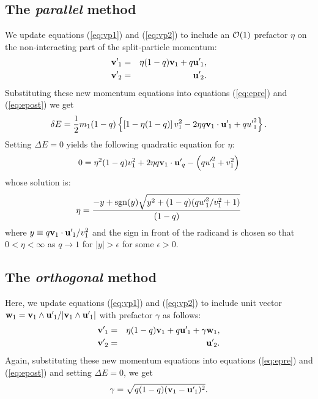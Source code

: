 \documentclass[12pt]{article}
\newcommand*{\myprime}{^{\prime}\mkern-1.2mu}
\newcommand{\bv}{{\bf v}}
\newcommand{\bw}{{\bf w}}
\newcommand{\bvp}{{\bf v}\myprime}
\newcommand{\bup}{{\bf u}\myprime}
\newcommand{\sgn}{\mathop{\rm sgn}\nolimits}
\begin{document}
\subsection{The \emph{parallel} method}

We update equations (\ref{eq:vp1}) and (\ref{eq:vp2}) to include an
${\cal O}(1)$ prefactor $\eta$ on the non-interacting part of the
split-particle momentum:
\begin{eqnarray}
\bvp_1 &=& \eta(1-q)\bv_1 + q\bup_1, \label{eq:vp1para}\\
\bvp_2 &=& \bup_2. \label{eq:vp2para}
\end{eqnarray}
Substituting these new momentum equations into equations
(\ref{eq:epre}) and (\ref{eq:epost}) we get
\begin{equation}
  \delta E = \frac12m_1(1-q)\left\{
  \left[1 - \eta(1-q)\right]v_1^2 - 2\eta q \bv_1\cdot\bup_1 +
  q{u\myprime}_1^2
  \right\}.
\end{equation}
Setting $\Delta E=0$ yields the following quadratic equation for
$\eta$:
\begin{equation}
  0 = \eta^2(1-q)v_1^2 + 2\eta q \bv_1\cdot\bup_q
  -\left(q{u\myprime}_1^2 + v_1^2\right)
\end{equation}
whose solution is:
\begin{equation}
  \eta = \frac{-y + \sgn(y)\sqrt{y^2 + (1-q)(q{u\myprime}_1^2/v_1^2 +
      1)}}{(1-q)}
\end{equation}
where $y\equiv q\bv_1\cdot\bup_1/v_1^2$ and the sign in front of the
radicand is chosen so that $0<\eta<\infty$ as $q\rightarrow1$ for
$|y|>\epsilon$ for some $\epsilon>0$.


\subsection{The \emph{orthogonal} method}
Here, we update equations (\ref{eq:vp1}) and (\ref{eq:vp2}) to include
unit vector $\bw_1 = \bv_1\wedge\bup_1/|\bv_1\wedge\bup_1|$ with prefactor
$\gamma$ as follows:
\begin{eqnarray}
\bvp_1 &=& \eta(1-q)\bv_1 + q\bup_1 +\gamma\bw_1, \label{eq:vp1orth}\\
\bvp_2 &=& \bup_2. \label{eq:vp2orth}
\end{eqnarray}
Again, substituting these new momentum equations into equations
(\ref{eq:epre}) and (\ref{eq:epost}) and setting $\Delta E=0$, we get
\begin{equation}
  \gamma = \sqrt{q(1-q)(\bv_1-\bup_1)^2}.
\end{equation}



\label{sec:ref}
\end{document}
